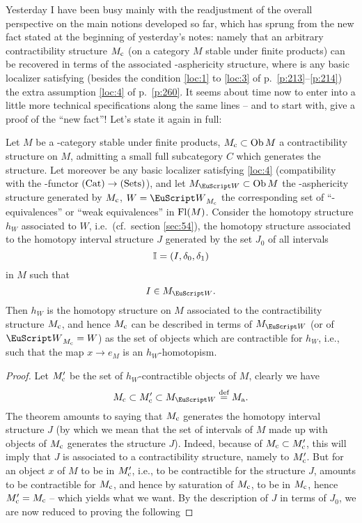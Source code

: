 \label{sec:82}%
Yesterday I have been busy mainly with the readjustment of the overall
perspective on the main notions developed so far, which has sprung
from the new fact stated at the beginning of yesterday's notes: namely
that an arbitrary contractibility structure $M_{\mathrm{c}}$ (on a category
$M$ stable under finite products) can be recovered in terms of the
associated \scrW-asphericity structure, where \scrW{} is any basic
localizer satisfying (besides the condition \ref{loc:1} to \ref{loc:3}
of p.\ \ref{p:213}--\ref{p:214}) the extra assumption \ref{loc:4} of
p.\ \ref{p:260}. It seems about time now to enter into a little more
technical specifications along the same lines -- and to start with,
give a proof of the ``new fact''! Let's state it again in full:
\begin{theoremnum}\label{thm:82.1}
  Let $M$ be a \scrU-category stable under finite products,
  $M_{\mathrm{c}}\subset\operatorname{Ob} M$ a contractibility structure on $M$, admitting a
  small full subcategory $C$ which generates the structure. Let
  moreover \scrW{} be any basic localizer satisfying
  \textup{\ref{loc:4}} \textup(compatibility with the \piz-functor
  ${(\mathrm{Cat})}\to{\ensuremath{(\mathrm{Sets})}}$\textup), and let $M_\scrW\subset\Ob M$ the
  \scrW-asphericity structure generated by $M_{\mathrm{c}}$\kern1pt,
  $W=\scrW_{M\subc}$ the corresponding set of ``\scrW-equivalences''
  or ``weak equivalences'' in $\operatorname{Fl}(M)$. Consider the homotopy
  structure $h_W$ associated to $W$, i.e.\ \textup(cf.\ section
  \ref{sec:54}\textup), the homotopy structure associated to the
  homotopy interval structure $J$ generated by the set $J_0$ of all
  intervals
  \[{\mathbb{I}}=(I,\delta_0,\delta_1)\]
  in $M$ such that
  \[I\in M_\scrW.\]
  Then $h_W$ is the homotopy structure on $M$ associated to the
  contractibility structure $M_{\mathrm{c}}$\kern1pt, and hence $M_{\mathrm{c}}$ can be
  described in terms of $M_\scrW$ \textup(or of
  $\scrW_{M\subc}=W$\textup) as the set of objects which are
  contractible for $h_W$, i.e., such that the map $x\to e_M$ is an $h_W$-homotopism.
\end{theoremnum}
\begin{proof}
  Let $M_{\mathrm{c}}'$ be the set of $h_W$-contractible objects of $M$,
  clearly we have
  \[ M\subc \subset M\subc'\subset M_\scrW \eqdef M\suba.\]
  The theorem amounts to saying that $M_{\mathrm{c}}$ generates the homotopy
  interval structure $J$ (by which we mean that the set of intervals
  of $M$ made up with objects of $M_{\mathrm{c}}$ generates the structure
  $J$). Indeed, because of $M_{\mathrm{c}}\subset M_{\mathrm{c}}'$, this will imply
  that $J$ is associated to a contractibility structure, namely to
  $M_{\mathrm{c}}'$. But for an object $x$ of $M$ to be in $M_{\mathrm{c}}'$, i.e., to
  be contractible for the structure $J$, amounts to be contractible
  for $M_{\mathrm{c}}$, and hence by saturation of $M_{\mathrm{c}}$, to be in
  $M_{\mathrm{c}}$, hence $M_{\mathrm{c}}'=M_{\mathrm{c}}$ -- which yields what
  we want. By the description of $J$ in terms of $J_0$, we
  are now reduced to proving the following
\end{proof}
